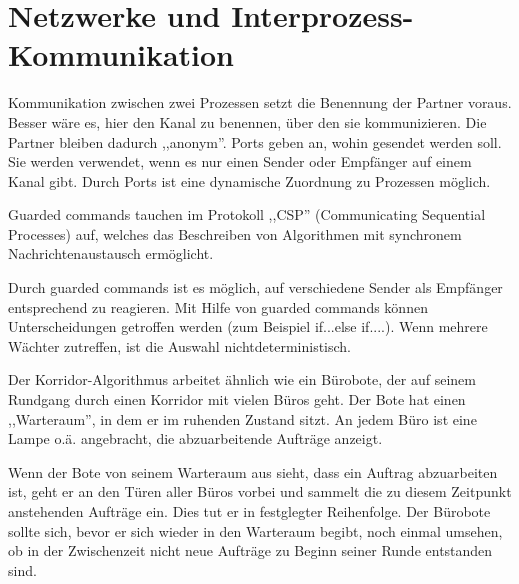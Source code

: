 \section{Netzwerke und Interprozess-Kommunikation}

\begin{answer}
Kommunikation zwischen zwei Prozessen setzt die Benennung der Partner voraus. Besser wäre es, hier den Kanal zu benennen, über den sie kommunizieren. Die Partner bleiben dadurch ,,anonym''. Ports geben an, wohin gesendet werden soll. Sie werden verwendet, wenn es nur einen Sender oder Empfänger auf einem Kanal gibt. Durch Ports ist eine dynamische Zuordnung zu Prozessen möglich.
\end{answer}

\begin{answer}
Guarded commands tauchen im Protokoll ,,CSP'' (Communicating Sequential Processes) auf, welches das Beschreiben von Algorithmen mit synchronem Nachrichtenaustausch ermöglicht.

Durch guarded commands ist es möglich, auf verschiedene Sender als Empfänger entsprechend
zu reagieren. Mit Hilfe von guarded commands können Unterscheidungen getroffen werden (zum Beispiel
if...else if....).
Wenn mehrere Wächter zutreffen, ist die Auswahl nichtdeterministisch.
\end{answer}

\begin{answer}
Der Korridor-Algorithmus arbeitet ähnlich wie ein Bürobote, der auf seinem Rundgang durch einen Korridor mit vielen Büros geht. Der Bote hat einen ,,Warteraum'', in dem er im ruhenden Zustand sitzt. An jedem Büro ist eine Lampe o.ä. angebracht, die abzuarbeitende Aufträge anzeigt.

Wenn der Bote von seinem Warteraum aus sieht, dass ein Auftrag abzuarbeiten ist, geht er an den Türen aller Büros vorbei und sammelt die zu diesem Zeitpunkt anstehenden Aufträge ein. Dies tut er in festglegter Reihenfolge. Der Bürobote sollte sich, bevor er sich wieder in den Warteraum begibt, noch einmal umsehen, ob in der Zwischenzeit nicht neue Aufträge zu Beginn seiner Runde entstanden sind.
\end{answer}

